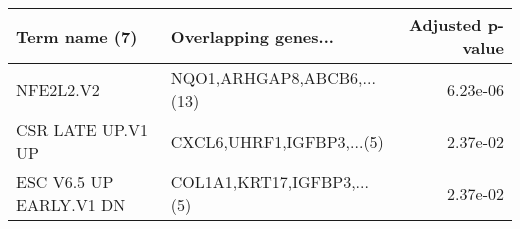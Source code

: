 \begin{tabular}{llr}
\toprule
          Term name (7) &       Overlapping genes... &  Adjusted p-value \\
\midrule
              NFE2L2.V2 & NQO1,ARHGAP8,ABCB6,...(13) &          6.23e-06 \\
      CSR LATE UP.V1 UP &  CXCL6,UHRF1,IGFBP3,...(5) &          2.37e-02 \\
ESC V6.5 UP EARLY.V1 DN & COL1A1,KRT17,IGFBP3,...(5) &          2.37e-02 \\
\bottomrule
\end{tabular}
